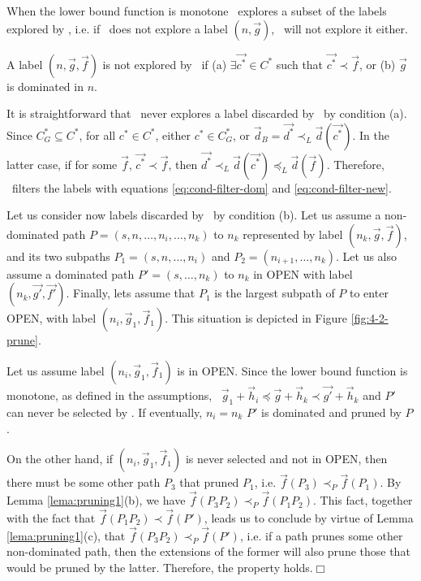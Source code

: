 \begin{teorema}\label{teo:subset}
When the lower bound function is monotone \lexgo \ explores a subset of the labels explored by \namoa, i.e. if \namoa \ does not explore a label $(n, \vec g)$, \lexgo \ will not explore it either.
\end{teorema}

\begin{demo}
A label $(n, \vec g, \vec f)$ is not explored by \namoa \ if (a) $\exists \vec{c^*} \in C^*$ such that $\vec{c^*} \prec \vec f$, or (b) $\vec g$ is dominated in $n$. 

It is straightforward that \lexgo \ never explores a label discarded by  \namoa \ by condition (a). Since  $C^*_G \subseteq C^*$, for all $c^* \in C^*$, either $c^* \in C_G^*$, or $\vec d_B = \vec{d^*} \prec_L \vec d(\vec{c^*})$. In the latter case, if for some $\vec f$, $\vec{c^*} \prec \vec f$, then $\vec{d^*} \prec_L \vec d(\vec{c^*}) \preceq_L \vec d(\vec f)$. Therefore, \lexgo \ filters the labels with equations \ref{eq:cond-filter-dom} and \ref{eq:cond-filter-new}.  

Let us consider now labels discarded by \namoa \ by condition (b). Let us assume a non-dominated path $P = (s, n, \ldots, n_i, \ldots, n_k)$ to $n_k$ represented by label $(n_k, \vec g, \vec f)$, and its two subpaths $P_1 = (s, n, \ldots, n_i)$ and $P_2 = (n_{i+1}, \ldots, n_k)$. Let us also assume a dominated path $P' = (s, \ldots, n_k)$ to $n_k$ in OPEN with label $(n_k, \vec{g'}, \vec{f'} )$.  Finally, lets assume that $P_1$ is the largest subpath of $P$ to enter OPEN, with label $(n_i, \vec g_1, \vec f_1)$. This situation is depicted in  Figure \ref{fig:4-2-prune}.

Let us assume label $(n_i, \vec g_1, \vec f_1)$ is in OPEN. Since the lower bound function is monotone, as defined in the assumptions, \ $\vec g_1 + \vec h_i \preceq \vec g + \vec h_k \prec \vec{g'} + \vec h_k$ and $P'$ can never be selected by \lexgo. If eventually, $n_i = n_k$ $P'$ is dominated and pruned by $P$.

On the other hand, if $(n_i, \vec g_1, \vec f_1)$ is never selected and not in OPEN, then there must be some other path $P_3$ that pruned $P_1$, i.e. $\vec f(P_3) \prec_P \vec f(P_1)$. By Lemma \ref{lema:pruning1}(b), we have $\vec f(P_3P_2) \prec_P \vec f(P_1P_2)$. This fact, together with the fact that $\vec f(P_1P_2) \prec \vec f(P')$, leads us to conclude by virtue of Lemma \ref{lema:pruning1}(c), that  $\vec f(P_3P_2) \prec_P \vec f(P')$, i.e. if a path prunes some other non-dominated path, then the extensions of the former will also prune those that would be pruned by the latter. Therefore, the property holds.$\Box$  


\end{demo}
